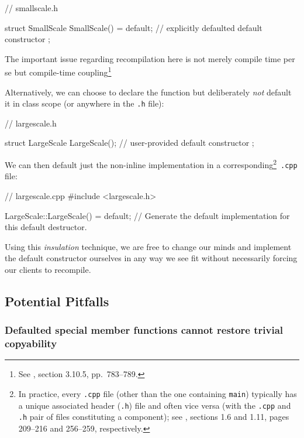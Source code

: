 \begin{emcppslisting}[language=C++]
// smallscale.h

struct SmallScale
{
    SmallScale() = default;  // explicitly defaulted default constructor
};
\end{emcppslisting}

\noindent The important issue regarding recompilation here is not merely compile time per se but compile-time coupling{\cprotect\footnote{See
  \cite{lakos20}, section 3.10.5, pp.~783--789.}}

Alternatively, we can choose to declare the function but deliberately
\emph{not} default it in class scope (or anywhere in the \lstinline!.h!
file):

\begin{emcppslisting}[language=C++]
// largescale.h

struct LargeScale
{
    LargeScale();  // user-provided default constructor
};
\end{emcppslisting}

\noindent We can then default just the non-inline implementation in a
corresponding{\cprotect\footnote{In practice, every \lstinline!.cpp! file
(other than the one containing \lstinline!main!) typically has a unique
associated header (\lstinline!.h!) file and often vice versa  (with the \lstinline!.cpp! and \lstinline!.h! pair of files constituting a component); see \cite{lakos20}, sections 1.6 and 1.11,
  pages 209--216 and 256--259, respectively.}}~\lstinline!.cpp! file:

\begin{emcppslisting}[language=C++]
// largescale.cpp
#include <largescale.h>

LargeScale::LargeScale() = default;
    // Generate the default implementation for this default destructor.
\end{emcppslisting}

\noindent Using this \emph{insulation} technique, we are free to change our minds
and implement the default constructor ourselves in any way we see fit
without necessarily forcing our clients to recompile.

\subsection[Potential Pitfalls]{Potential Pitfalls}\label{potential-pitfalls}

\subsubsection[Defaulted special member functions cannot restore trivial copyability]{Defaulted special member functions cannot restore trivial copyability}


